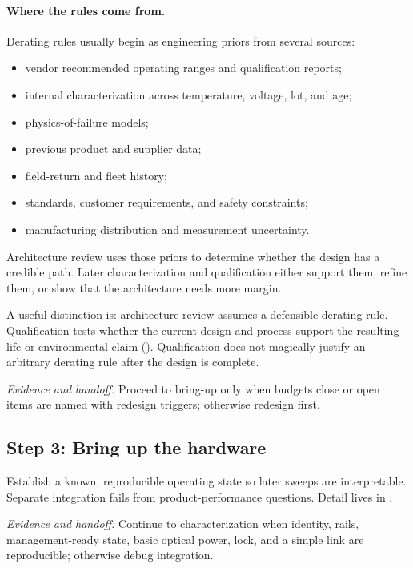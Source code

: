 \paragraph{Where the rules come from.}

Derating rules usually begin as engineering priors from several sources:
\begin{itemize}
\item vendor recommended operating ranges and qualification reports;
\item internal characterization across temperature, voltage, lot, and age;
\item physics-of-failure models;
\item previous product and supplier data;
\item field-return and fleet history;
\item standards, customer requirements, and safety constraints;
\item manufacturing distribution and measurement uncertainty.
\end{itemize}
Architecture review uses those priors to determine whether the design has a
credible path. Later characterization and qualification either support them,
refine them, or show that the architecture needs more margin.

A useful distinction is: architecture review assumes a defensible derating
rule. Qualification tests whether the current design and process support the
resulting life or environmental claim
(). Qualification does not magically justify an arbitrary
derating rule after the design is complete.

\textit{Evidence and handoff:} Proceed to bring-up only when budgets close or
open items are named with redesign triggers; otherwise redesign first.

\subsection{Step 3: Bring up the hardware}
\label{sec:ladder-bringup}

Establish a known, reproducible operating state so later sweeps are
interpretable. Separate integration fails from product-performance questions.
Detail lives in .

\textit{Evidence and handoff:} Continue to characterization when identity,
rails, management-ready state, basic optical power, lock, and a simple link are
reproducible; otherwise debug integration.

